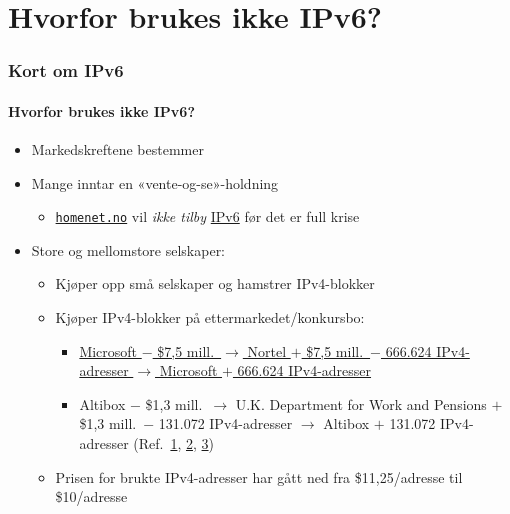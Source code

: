 \section{Hvorfor brukes ikke IPv6?}
\begin{frame}%
  \frametitle{Kort om IPv6}
  \framesubtitle{Hvorfor brukes ikke IPv6?}
  \begin{itemize}%
  \item Markedskreftene bestemmer
  \item Mange inntar en «vente-og-se»-holdning
    \begin{itemize}%
    \item \href{https://homenet.no/}{\texttt{homenet.no}} vil
      \textit{ikke tilby\/}
      \href{https://homenet.no/kundeservice/kundeservice_og_hjelp/teknisk/hva_betyr_egentlig_adsl__vdsl_og_andre_ord_som_vi_bruker_/har_dere_ikke_ipv6_}{IPv6}
      før det er full krise
    \end{itemize}
  \item Store og mellomstore selskaper:
    \begin{itemize}%
    \item Kjøper opp små selskaper og hamstrer IPv4-blokker
    \item Kjøper IPv4-blokker på ettermarkedet/konkursbo:
      \begin{itemize}%
      \item
        \href{http://www.computerworld.com/s/article/9215055/Microsoft_offers_7.5M_for_666_624_IPv4_addresses}{Microsoft
          \(-\) \$7,5 mill.\ \(\to\) Nortel \(+\) \$7,5 mill.\ \(-\) 666.624 IPv4-adresser \(\to\) Microsoft \(+\)
          666.624 IPv4-adresser}

      \item Altibox \(-\)
        \$1,3 mill.\ \(\to\)
        U.K. Department for Work and Pensions \(+\)
        \$1,3 mill.\ \(-\)
        131.072 IPv4-adresser \(\to\)
        Altibox \(+\) 131.072 IPv4-adresser
        (Ref.\
        \href{http://www.standard.difi.no/filearchive/samf-ok-analyse-ipv6-v0-8.pdf}{1},
        \href{http://www.digi.no/bedriftsteknologi/2015/05/26/altibox-kjoper-131.072-ip-adresser-fra-england}{2},
        \href{http://www.bbc.com/news/technology-32826353}{3})
      \end{itemize}
    \item Prisen for brukte IPv4-adresser har gått ned fra
      \$11,25/adresse til \$10/adresse
    \end{itemize}
  \end{itemize}
\end{frame}

